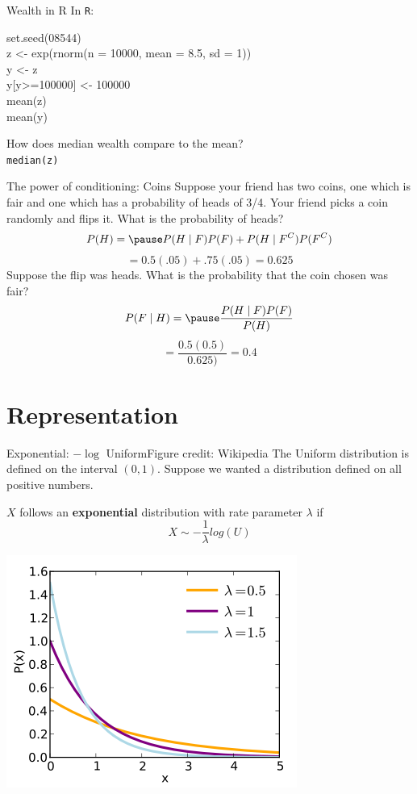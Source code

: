\documentclass{beamer}
\newenvironment{alltt}{\ttfamily}{\par}
\begin{document}
\begin{frame}{Wealth in R}
In \texttt{R}: \pause

\begin{alltt}
set.seed(08544) \\
z <- exp(rnorm(n = 10000, mean = 8.5, sd = 1)) \\
y <- z \\
y[y>=100000] <- 100000 \\
mean(z) \\
mean(y) \\
\end{alltt}

How does median wealth compare to the mean? \\
\texttt{median(z)}
\end{frame}

\begin{frame}{The power of conditioning: Coins}
Suppose your friend has two coins, one which is fair and one which has a probability of heads of 3/4. Your friend picks a coin randomly and flips it. What is the probability of heads?
\pause
$$P(H)=\pause P(H\mid F)P(F)+P(H\mid F^C)P(F^C)$$
\pause
$$=0.5(.05)+.75(.05)=0.625$$
\pause
Suppose the flip was heads. What is the probability that the coin chosen was fair?
$$P(F\mid H)=\pause\frac{P(H\mid F)P(F)}{P(H)}$$
\pause
$$=\frac{0.5(0.5)}{0.625)}=0.4$$
\end{frame}

\section{Representation}
\begin{frame}{Exponential: $-\log$ Uniform}{Figure credit: Wikipedia}
The Uniform distribution is defined on the interval $(0,1)$. Suppose we wanted a distribution defined on all positive numbers.
\begin{definition}
$X$ follows an \textbf{exponential} distribution with rate parameter $\lambda$ if
$$X\sim -\frac{1}{\lambda} log(U)$$
\end{definition}
\begin{center}\includegraphics[scale=.3]{figures/ExpoPDF.png}\end{center}
\end{frame}
\end{document}
